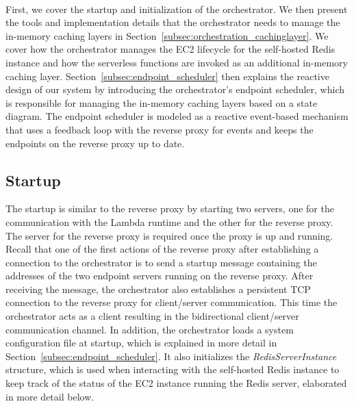 ~\\
First, we cover the startup and initialization of the orchestrator. We then present the tools and implementation details that the orchestrator needs to manage the in-memory caching layers in Section~\ref{subsec:orchestration_cachinglayer}. We cover how the orchestrator manages the EC2 lifecycle for the self-hosted Redis instance and how the serverless functions are invoked as an additional in-memory caching layer. Section~\ref{subsec:endpoint_scheduler} then explains the reactive design of our system by introducing the orchestrator's endpoint scheduler, which is responsible for managing the in-memory caching layers based on a state diagram. The endpoint scheduler is modeled as a reactive event-based mechanism that uses a feedback loop with the reverse proxy for events and keeps the endpoints on the reverse proxy up to date.


\subsection{Startup}
The startup is similar to the reverse proxy by starting two servers, one for the communication with the Lambda runtime and the other for the reverse proxy. The server for the reverse proxy is required once the proxy is up and running. Recall that one of the first actions of the reverse proxy after establishing a connection to the orchestrator is to send a startup message containing the addresses of the two endpoint servers running on the reverse proxy. After receiving the message, the orchestrator also establishes a persistent TCP connection to the reverse proxy for client/server communication. This time the orchestrator acts as a client resulting in the bidirectional client/server communication channel. In addition, the orchestrator loads a system configuration file at startup, which is explained in more detail in Section~\ref{subsec:endpoint_scheduler}. It also initializes the \emph{RedisServerInstance} structure, which is used when interacting with the self-hosted Redis instance to keep track of the status of the EC2 instance running the Redis server, elaborated in more detail below.

